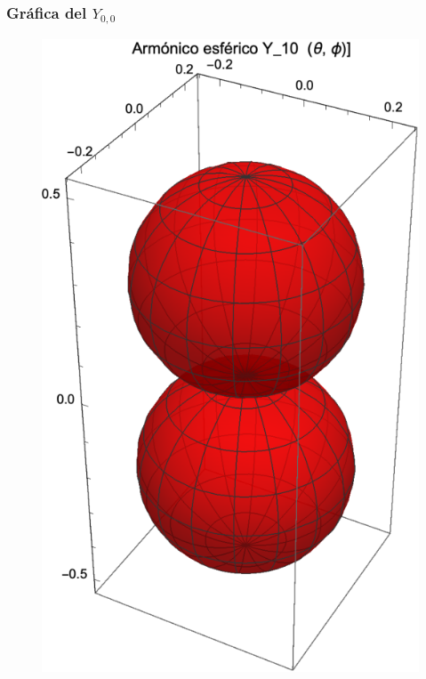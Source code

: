 \documentclass[12pt]{beamer}
\begin{document}
\begin{frame}
\frametitle{Gráfica del $Y_{0,0}$}
\begin{figure}[H]
    \centering
    \includegraphics[scale=0.65]{Imagenes/Armonicos_Esfericos_10.eps}
\end{figure}
\end{frame}
\end{document}
